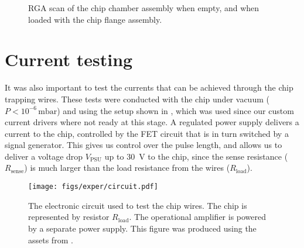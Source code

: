   \begin{figure}[htb]
  \centering
  \caption[RGA scan of empty and full chambers]{
    RGA scan of the chip chamber assembly when empty, and when loaded with the
  chip flange assembly.}
  \label{exper:fig:rga}
\end{figure}


\section{Current testing}
\label{exper:current}

It was also important to test the currents that can be achieved through the
chip trapping wires. These tests were conducted with the chip under vacuum
($P<10^{-6}\,\si{\milli\bar}$) and using the setup shown in
, which was used since our custom current drivers
where not ready at this stage. A regulated power supply delivers a current to
the chip, controlled by the FET circuit that is in turn switched by a signal
generator. This gives us control over the pulse length, and allows us to
deliver a voltage drop $V_\text{PSU}$ up to \SI{30}{\volt} to the chip, since
the sense resistance ($R_\text{sense}$) is much larger than the load resistance
from the wires ($R_\text{load}$).


\begin{figure}[htb]
  \centering
  \texttt{[image: figs/exper/circuit.pdf]}
  \caption[Current testing electronics]{
    The electronic circuit used to test the chip wires. The chip is
  represented by resistor $R_\text{load}$. The operational amplifier is powered
  by a separate power supply. This figure was produced using the assets from
  .}
  \label{exper:fig:curtest}
\end{figure}

